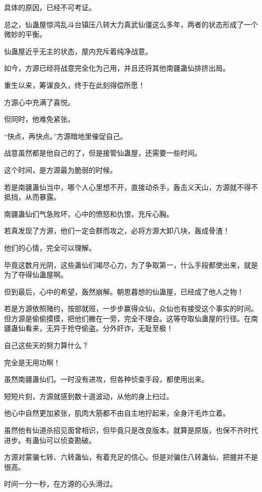 
\begin{this_body}

具体的原因，已经不可考证。

总之，仙蛊屋惊鸿乱斗台镇压八转大力真武仙僵这么多年，两者的状态形成了一个微妙的平衡。

仙蛊屋近乎无主的状态，屋内充斥着纯净战意。

如今，方源已经将战意完全化为己用，并且还将其他南疆蛊仙排挤出局。

重生以来，筹谋良久，终于在此刻得偿所愿！

方源心中充满了喜悦。

但同时，他难免紧张。

“快点，再快点。”方源暗地里催促自己。

战意虽然都是他自己的了，但是接管仙蛊屋，还需要一些时间。

这个时间，是方源最为脆弱的时候。

若是南疆蛊仙当中，哪个人心里想不开，直接动杀手，轰击义天山，方源就不得不抵挡，从而暴露。

南疆蛊仙们气急败坏，心中的愤怒和仇恨，充斥心胸。

若真发现了方源，他们一定会群而攻之，必将方源大卸八块，轰成骨渣！

他们的心情，完全可以理解。

毕竟这数月光阴，这些蛊仙们竭尽心力，为了争取第一，什么手段都使出来，就是为了夺得仙蛊屋啊。

但到最后，心中的希望，轰然崩解。朝思暮想的仙蛊屋，已经成了他人之物！

若是方源依照赌约，按部就班，一步步赢得众仙，众仙也有接受这个事实的时间。但方源是偷偷摸摸，把他们撇在一旁，完全不理会。这等夺取仙蛊屋的行径。在南疆蛊仙看来，无异于抢夺偷盗。分外奸诈，无耻至极！

自己这些天的努力算什么？

完全是无用功啊！

虽然南疆蛊仙们。一时没有进攻，但各种侦查手段，都使用出来。

短短片刻，方源就感到数十道波动，从他的身上扫过。

他心中自然更加紧张，肌肉大筋都不由自主地拧起来，全身汗毛炸立着。

虽然他有仙道杀招见面曾相识，但毕竟只是改良版本。就算是原版，也保不齐时代进步。有蛊仙可以侦查勘破。

方源对蒙骗七转、六转蛊仙，有着充足的信心。但是对骗住八转蛊仙，把握并不是很高。

时间一分一秒，在方源的心头滑过。


\end{this_body}

